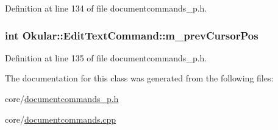 Definition at line 134 of file documentcommands\+\_\+p.\+h.

\hypertarget{classOkular_1_1EditTextCommand_a5bc4e5af11ce42281c590750e0c75b51}{
\subsubsection[{m\+\_\+prev\+Cursor\+Pos}]{\setlength{\rightskip}{0pt plus 5cm}int Okular\+::\+Edit\+Text\+Command\+::m\+\_\+prev\+Cursor\+Pos\hspace{0.3cm}{\ttfamily [protected]}}}\label{classOkular_1_1EditTextCommand_a5bc4e5af11ce42281c590750e0c75b51}


Definition at line 135 of file documentcommands\+\_\+p.\+h.



The documentation for this class was generated from the following files\+:\begin{DoxyCompactItemize}
\item 
core/\hyperlink{documentcommands__p_8h}{documentcommands\+\_\+p.\+h}\item 
core/\hyperlink{documentcommands_8cpp}{documentcommands.\+cpp}\end{DoxyCompactItemize}
